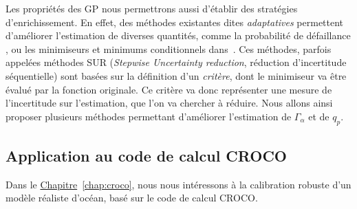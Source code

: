 \documentclass[../../Main_ManuscritThese.tex]{subfiles}
\newcommand{\frchap}[1]{\hyperref[#1]{Chapitre}~\ref{#1}}
\begin{document}
Les propriétés des GP nous permettrons aussi d'établir des stratégies
d'enrichissement. En effet, des méthodes existantes dites
\emph{adaptatives} permettent d'améliorer l'estimation de diverses
quantités, comme la probabilité de défaillance
\cite{razaaly_rare_2019,moustapha_quantile-based_2016,bect_sequential_2012},
ou les minimiseurs et minimums conditionnels
dans~\cite{ginsbourger_bayesian_2014}. Ces méthodes, parfois appelées
méthodes SUR (\emph{Stepwise Uncertainty reduction}, réduction
d'incertitude séquentielle) sont basées sur la définition d'un
\emph{critère}, dont le minimiseur va être évalué par la fonction
originale. Ce critère va donc représenter une mesure de l'incertitude
sur l'estimation, que l'on va chercher à réduire. Nous allons ainsi
proposer plusieurs méthodes permettant d'améliorer l'estimation de
$\Gamma_{\alpha}$ et de $q_p$.


\subsection*{Application au code de calcul CROCO}
Dans le \frchap{chap:croco}, nous nous intéressons à la calibration
robuste d'un modèle réaliste d'océan, basé sur le code de calcul CROCO.



\vfill
\etoile
\vfill
\end{document}
